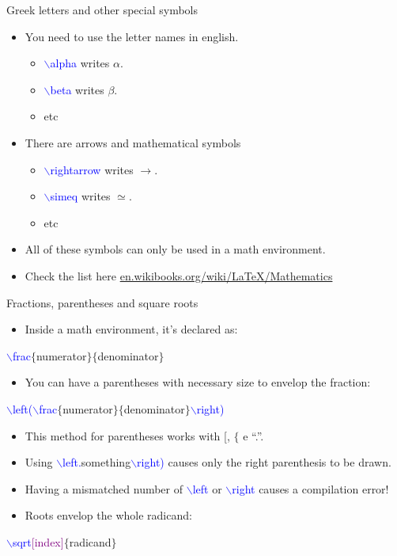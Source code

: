 \documentclass[usenames,dvipsnames,aspectratio=169]{beamer}
\newcommand{\aitem}{\item[$\cdot$]}
\newcommand{\bitem}{\item[-]}
\begin{document}

\begin{frame}[t]{Greek letters and other special symbols}
\begin{itemize}
\aitem You need to use the letter names in english.
\begin{itemize}
\bitem \textcolor{blue}{$\backslash$alpha} writes $\alpha$.
\bitem \textcolor{blue}{$\backslash$beta} writes $\beta$.
\bitem etc
\end{itemize}
\aitem There are arrows and mathematical symbols
\begin{itemize}
\bitem \textcolor{blue}{$\backslash$rightarrow} writes $\rightarrow$.
\bitem \textcolor{blue}{$\backslash$simeq} writes $\simeq$.
\bitem etc
\end{itemize}
\aitem All of these symbols can only be used in a math environment.
\aitem Check the list here \textcolor{blue}{\url{en.wikibooks.org/wiki/LaTeX/Mathematics}}
\end{itemize}
\end{frame}


\begin{frame}[t]{Fractions, parentheses and square roots}
\begin{itemize}
\aitem Inside a math environment, it's declared as:
\end{itemize}
\textcolor{blue}{$\backslash$frac}\textcolor{PineGreen}{$\{$numerator$\}$}\textcolor{PineGreen}{$\{$denominator$\}$}
\begin{itemize}
\aitem You can have a parentheses with necessary size to envelop the fraction:
\end{itemize}
\textcolor{blue}{$\backslash$left(}\textcolor{blue}{$\backslash$frac}\textcolor{PineGreen}{$\{$numerator$\}$}\textcolor{PineGreen}{$\{$denominator$\}$}\textcolor{blue}{$\backslash$right)}
\begin{itemize}
\aitem This method for parentheses works with [, $\{$ e ``.''. 
\aitem Using \textcolor{blue}{$\backslash$left.}\textcolor{PineGreen}{something}\textcolor{blue}{$\backslash$right)} causes only the right parenthesis to be drawn.
\aitem Having a mismatched number of \textcolor{blue}{$\backslash$left} or \textcolor{blue}{$\backslash$right} causes a compilation error!
\aitem Roots envelop the whole radicand:
\end{itemize}
\textcolor{blue}{$\backslash$sqrt}\textcolor{purple}{[index]}\textcolor{PineGreen}{$\{$radicand$\}$}
\end{frame}
\end{document}
